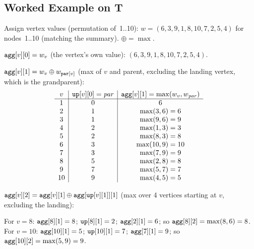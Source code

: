 \subsection{Worked Example on T}

Assign vertex values (permutation of~1..10): \(w = (6,3,9,1,8,10,7,2,5,4)\)
for nodes~1..10 (matching the summary).  \(\oplus = \max\).

\(\texttt{agg}[v][0] = w_v\) (the vertex's own value):
\((6,3,9,1,8,10,7,2,5,4)\).

\(\texttt{agg}[v][1] = w_v \oplus w_{\texttt{par}[v]}\) (max of \(v\) and parent,
excluding the landing vertex, which is the grandparent):
\[
\begin{array}{c|c|c}
v & \texttt{up}[v][0] = \mathit{par} & \texttt{agg}[v][1] = \max(w_v, w_{\mathit{par}}) \\ \hline
1 & 0 & 6 \\
2 & 1 & \max(3,6)=6 \\
3 & 1 & \max(9,6)=9 \\
4 & 2 & \max(1,3)=3 \\
5 & 2 & \max(8,3)=8 \\
6 & 3 & \max(10,9)=10 \\
7 & 3 & \max(7,9)=9 \\
8 & 5 & \max(2,8)=8 \\
9 & 7 & \max(5,7)=7 \\
10 & 9 & \max(4,5)=5
\end{array}
\]

\(\texttt{agg}[v][2] = \texttt{agg}[v][1] \oplus \texttt{agg}[\texttt{up}[v][1]][1]\)
(max over 4 vertices starting at \(v\), excluding the landing):

For \(v = 8\): \(\texttt{agg}[8][1] = 8\); \(\texttt{up}[8][1] = 2\);
\(\texttt{agg}[2][1] = 6\); so \(\texttt{agg}[8][2] = \max(8,6) = 8\).
For \(v = 10\): \(\texttt{agg}[10][1] = 5\); \(\texttt{up}[10][1] = 7\);
\(\texttt{agg}[7][1] = 9\); so \(\texttt{agg}[10][2] = \max(5,9) = 9\).

